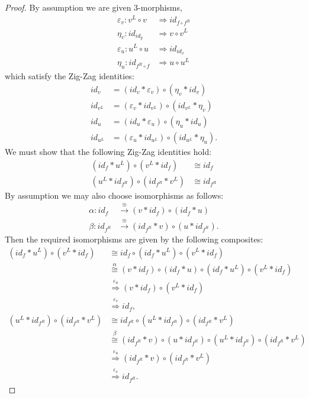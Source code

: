 \documentclass{amsart}
\begin{document}
\begin{proof}
 

By assumption we are given 3-morphisms,
\begin{align*}
	\varepsilon_v: v^L \circ v & \Rightarrow id_{f \circ f^R} \\
	\eta_v: id_{id_y} & \Rightarrow v \circ v^L \\
	\varepsilon_u: u^L \circ u & \Rightarrow id_{id_x} \\
	\eta_u: id_{f^R \circ f} & \Rightarrow  u \circ u^L
\end{align*}
which satisfy the Zig-Zag identities:
\begin{align*}
	 id_v  &= (id_v * \varepsilon_v) \circ (\eta_v * id_v)  \\
	 id_{v^L}  &= (\varepsilon_v * id_{v^L} ) \circ (id_{v^L} * \eta_v)  \\
	 id_u  &= (id_u * \varepsilon_u) \circ (\eta_u * id_u)  \\
	 id_{u^L}  &= (\varepsilon_u * id_{u^L} ) \circ (id_{u^L} * \eta_u).  
\end{align*}
We must show that the following Zig-Zag identities hold:
\begin{align*}
	 (id_{f} * u^L) \circ (v^L * id_{f} ) & \cong id_{f} \\
 	 (u^L * id_{f^R}) \circ (id_{f^R} * v^L) & \cong id_{f^R} 
\end{align*}
By assumption we may also choose isomorphisms as follows:
\begin{align*}
	\alpha: id_f &\stackrel{\cong}{\to} (v * id_f) \circ (id_f * u) \\
	\beta: id_{f^R} &\stackrel{\cong}{\to} (id_{f^R} * v) \circ (u * id_{f^R} ).
\end{align*}
Then the required isomorphisms are given by the following composites:
\begin{align*}
	(id_{f} * u^L) \circ (v^L * id_{f} )
		& \cong id_f \circ (id_{f} * u^L) \circ (v^L * id_{f} ) \\
		& \stackrel{\alpha}{\cong} (v * id_f) \circ (id_f * u) \circ (id_{f} * u^L) \circ (v^L * id_{f} ) \\
		&  \stackrel{\varepsilon_u }{\Rightarrow} (v * id_f) \circ (v^L * id_{f} ) \\
		& \stackrel{\varepsilon_v }{\Rightarrow} id_{f},  \\
	(u^L * id_{f^R}) \circ (id_{f^R} * v^L) 
		& \cong  id_{f^R} \circ (u^L * id_{f^R}) \circ (id_{f^R} * v^L)  \\
		& \stackrel{\beta}{\cong}  (id_{f^R} * v) \circ (u * id_{f^R} )  \circ (u^L * id_{f^R}) \circ (id_{f^R} * v^L) \\
		& \stackrel{\varepsilon_u }{\Rightarrow} (id_{f^R} * v) \circ (id_{f^R} * v^L) \\
		& \stackrel{\varepsilon_v }{\Rightarrow} id_{f^R}.
\end{align*}
\end{proof}
\end{document}
